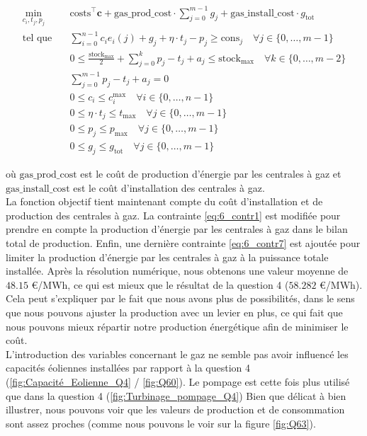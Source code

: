 \documentclass{article}
\begin{document}
\begin{align}
    \min_{c_{i},t_j,p_j} \quad &\mathrm{costs}^\intercal\mathbf{c} + \mathrm{gas\_prod\_cost}\cdot \sum_{j=0}^{m-1} g_j + \mathrm{gas\_install\_cost} \cdot g_\mathrm{tot}\nonumber\\
    \textrm{tel que} \quad & \sum_{i=0}^{n-1} c_i e_i(j) + g_j + \eta \cdot t_j - p_j \ge \mathrm{cons}_j \quad \forall j \in  \{ 0, \ldots, m-1 \}\label{eq:6_contr1}\\
    & 0 \le \frac{\mathrm{stock}_\mathrm{max}}{2}  + \sum_{j=0}^{k} p_j - t_j + a_j \le  \mathrm{stock}_\mathrm{max} \quad \forall k \in \{ 0, \ldots, m-2 \}\label{eq:6_contr2}\\
    & \sum_{j=0}^{m-1} p_j - t_j + a_j = 0 \label{eq:6_contr3}\\
    & 0 \le c_i \le c_i^\mathrm{max} \quad \forall i \in  \{ 0, \ldots, n-1 \}  \label{eq:6_contr4}\\
    & 0 \le \eta \cdot t_j \le  t_\mathrm{max} \quad \forall j \in  \{ 0, \ldots, m-1 \}  \label{eq:6_contr5}\\
    & 0 \le p_j \le  p_\mathrm{max} \quad \forall j \in  \{ 0, \ldots, m-1 \} \label{eq:6_contr6}\\
    & 0 \le g_j \le g_\mathrm{tot} \quad \forall j \in  \{ 0, \ldots, m-1 \} \label{eq:6_contr7}
\end{align}

\noindent où $\mathrm{gas\_prod\_cost}$ est le coût de production d'énergie par les centrales à gaz et $\mathrm{gas\_install\_cost}$ est le coût d'installation des centrales à gaz.\\
La fonction objectif tient maintenant compte du coût d'installation et de production des centrales à gaz. La contrainte \eqref{eq:6_contr1} est modifiée pour prendre en compte la production d'énergie par les centrales à gaz dans le bilan total de production. 
Enfin, une dernière contrainte \eqref{eq:6_contr7} est ajoutée pour limiter la production d'énergie par les centrales à gaz à la puissance totale installée.
Après la résolution numérique, nous obtenons une valeur moyenne de $\mathbf{48.15}$ \euro/MWh, ce qui est mieux que 
le résultat de la question 4 ($\mathbf{58.282}$ \euro/MWh). Cela peut s'expliquer par le fait que nous
avons plus de possibilités, dans le sens que nous pouvons ajuster la production avec un levier en plus,
ce qui fait que nous pouvons mieux répartir notre production énergétique afin de minimiser le coût. \\
L'introduction des variables concernant le gaz ne semble pas avoir influencé les capacités éoliennes installées 
par rapport à la question 4 (\autoref{fig:Capacité_Eolienne_Q4} / \autoref{fig:Q60}). 
Le pompage est cette fois plus utilisé que dans la question 4 (\autoref{fig:Turbinage_pompage_Q4})
Bien que délicat à bien illustrer, nous pouvons voir que les valeurs de production et de consommation sont 
assez proches (comme nous pouvons le voir sur la figure \ref{fig:Q63}).
\end{document}
